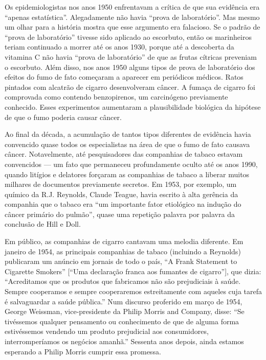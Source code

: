 \documentclass[11pt,a5paper,twoside]{book}
\begin{document}
Os epidemiologistas nos anos 1950 enfrentavam a crítica de que sua evidência era “apenas estatística”. Alegadamente não havia “prova de laboratório”. Mas mesmo um olhar para a história mostra que esse argumento era falacioso. Se o padrão de “prova de laboratório” tivesse sido aplicado ao escorbuto, então os marinheiros teriam continuado a morrer até os anos 1930, porque até a descoberta da vitamina C não havia “prova de laboratório” de que as frutas cítricas preveniam o escorbuto. Além disso, nos anos 1950 alguns tipos de prova de laboratório dos efeitos do fumo de fato começaram a aparecer em periódicos médicos. Ratos pintados com alcatrão de cigarro desenvolveram câncer. A fumaça de cigarro foi comprovada como contendo benzopirenos, um carcinógeno previamente conhecido. Esses experimentos aumentaram a plausibilidade biológica da hipótese de que o fumo poderia causar câncer.

Ao final da década, a acumulação de tantos tipos diferentes de evidência havia convencido quase todos os especialistas na área de que o fumo de fato causava câncer. Notavelmente, até pesquisadores das companhias de tabaco estavam convencidos — um fato que permaneceu profundamente oculto até os anos 1990, quando litígios e delatores forçaram as companhias de tabaco a liberar muitos milhares de documentos previamente secretos. Em 1953, por exemplo, um químico da R.J. Reynolds, Claude Teague, havia escrito à alta gerência da companhia que o tabaco era “um importante fator etiológico na indução do câncer primário do pulmão”, quase uma repetição palavra por palavra da conclusão de Hill e Doll.

Em público, as companhias de cigarro cantavam uma melodia diferente. Em janeiro de 1954, as principais companhias de tabaco (incluindo a Reynolds) publicaram um anúncio em jornais de todo o país, “A Frank Statement to Cigarette Smokers” [“Uma declaração franca aos fumantes de cigarro”], que dizia: “Acreditamos que os produtos que fabricamos não são prejudiciais à saúde. Sempre cooperamos e sempre cooperaremos estreitamente com aqueles cuja tarefa é salvaguardar a saúde pública.” Num discurso proferido em março de 1954, George Weissman, vice-presidente da Philip Morris and Company, disse: “Se tivéssemos qualquer pensamento ou conhecimento de que de alguma forma estivéssemos vendendo um produto prejudicial aos consumidores, interromperíamos os negócios amanhã.” Sessenta anos depois, ainda estamos esperando a Philip Morris cumprir essa promessa.
\end{document}
